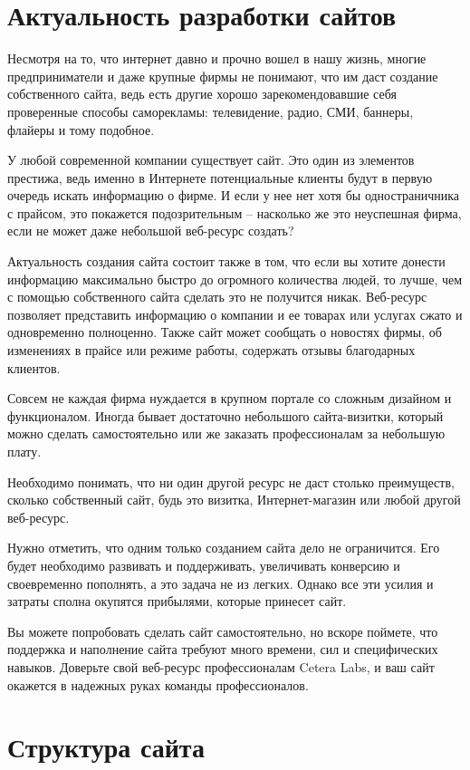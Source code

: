 \documentclass[oneside,final,14pt]{extreport}
\begin{document}
\chapter{Актуальность разработки сайтов}
Несмотря на то, что интернет давно и прочно вошел в нашу жизнь, многие предприниматели и даже крупные фирмы не понимают, что им даст создание собственного сайта, ведь есть другие хорошо зарекомендовавшие себя проверенные способы саморекламы: телевидение, радио, СМИ, баннеры, флайеры и тому подобное.

У любой современной компании существует сайт. Это один из элементов престижа, ведь именно в Интернете потенциальные клиенты будут в первую очередь искать информацию о фирме. И если у нее нет хотя бы одностраничника с прайсом, это покажется подозрительным – насколько же это неуспешная фирма, если не может даже небольшой веб-ресурс создать?

Актуальность создания сайта состоит также в том, что если вы хотите донести информацию максимально быстро до огромного количества людей, то лучше, чем с помощью собственного сайта сделать это не получится никак. Веб-ресурс позволяет представить информацию о компании и ее товарах или услугах сжато и одновременно полноценно. Также сайт может сообщать о новостях фирмы, об изменениях в прайсе или режиме работы, содержать отзывы благодарных клиентов.

Совсем не каждая фирма нуждается в крупном портале со сложным дизайном и функционалом. Иногда бывает достаточно небольшого сайта-визитки, который можно сделать самостоятельно или же заказать профессионалам за небольшую плату.

Необходимо понимать, что ни один другой ресурс не даст столько преимуществ, сколько собственный сайт, будь это визитка, Интернет-магазин или любой другой веб-ресурс.

Нужно отметить, что одним только созданием сайта дело не ограничится. Его будет необходимо развивать и поддерживать, увеличивать конверсию и своевременно пополнять, а это задача не из легких. Однако все эти усилия и затраты сполна окупятся прибылями, которые принесет сайт.

Вы можете попробовать сделать сайт самостоятельно, но вскоре поймете, что поддержка и наполнение сайта требуют много времени, сил и специфических навыков. Доверьте свой веб-ресурс профессионалам Cetera Labs, и ваш сайт окажется в надежных руках команды профессионалов.

\chapter{Структура сайта}
\end{document}
